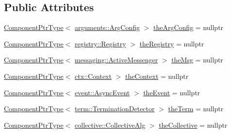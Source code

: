 \subsection*{Public Attributes}
\begin{DoxyCompactItemize}
\item 
\hyperlink{structvt_1_1runtime_1_1_runtime_a0893bf0a8c03b898e8ab66b52cec80ad}{Component\+Ptr\+Type}$<$ \hyperlink{structvt_1_1arguments_1_1_arg_config}{arguments\+::\+Arg\+Config} $>$ \hyperlink{structvt_1_1runtime_1_1_runtime_a30b262f43f826ffee213e10c71893323}{the\+Arg\+Config} = nullptr
\item 
\hyperlink{structvt_1_1runtime_1_1_runtime_a0893bf0a8c03b898e8ab66b52cec80ad}{Component\+Ptr\+Type}$<$ \hyperlink{structvt_1_1registry_1_1_registry}{registry\+::\+Registry} $>$ \hyperlink{structvt_1_1runtime_1_1_runtime_ae68159c1077f342a4a311627fe3be19a}{the\+Registry} = nullptr
\item 
\hyperlink{structvt_1_1runtime_1_1_runtime_a0893bf0a8c03b898e8ab66b52cec80ad}{Component\+Ptr\+Type}$<$ \hyperlink{structvt_1_1messaging_1_1_active_messenger}{messaging\+::\+Active\+Messenger} $>$ \hyperlink{structvt_1_1runtime_1_1_runtime_a8aad5f2fdd05ddd81995f5af94ce196e}{the\+Msg} = nullptr
\item 
\hyperlink{structvt_1_1runtime_1_1_runtime_a0893bf0a8c03b898e8ab66b52cec80ad}{Component\+Ptr\+Type}$<$ \hyperlink{structvt_1_1ctx_1_1_context}{ctx\+::\+Context} $>$ \hyperlink{structvt_1_1runtime_1_1_runtime_a572dac3bef0126b593a93b2c651efb7e}{the\+Context} = nullptr
\item 
\hyperlink{structvt_1_1runtime_1_1_runtime_a0893bf0a8c03b898e8ab66b52cec80ad}{Component\+Ptr\+Type}$<$ \hyperlink{structvt_1_1event_1_1_async_event}{event\+::\+Async\+Event} $>$ \hyperlink{structvt_1_1runtime_1_1_runtime_accfb27cbfaecafe834ade7cd6dc57d7b}{the\+Event} = nullptr
\item 
\hyperlink{structvt_1_1runtime_1_1_runtime_a0893bf0a8c03b898e8ab66b52cec80ad}{Component\+Ptr\+Type}$<$ \hyperlink{structvt_1_1term_1_1_termination_detector}{term\+::\+Termination\+Detector} $>$ \hyperlink{structvt_1_1runtime_1_1_runtime_a365e1addbed82440bb014f97b1c839f6}{the\+Term} = nullptr
\item 
\hyperlink{structvt_1_1runtime_1_1_runtime_a0893bf0a8c03b898e8ab66b52cec80ad}{Component\+Ptr\+Type}$<$ \hyperlink{structvt_1_1collective_1_1_collective_alg}{collective\+::\+Collective\+Alg} $>$ \hyperlink{structvt_1_1runtime_1_1_runtime_a52b4a07eacf90a576f077e193604eab9}{the\+Collective} = nullptr
\item 

\end{DoxyCompactItemize}
